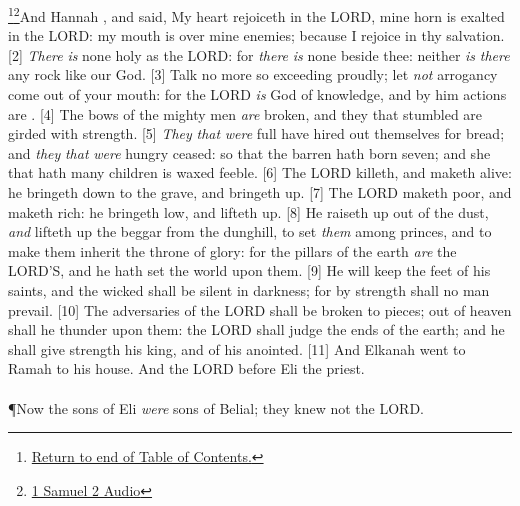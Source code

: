\footnote{\textcolor[cmyk]{0.99998,1,0,0}{\hyperlink{TOC}{Return to end of Table of Contents.}}}\footnote{\href{https://audiobible.com/bible/1_samuel_2.html}{\textcolor[cmyk]{0.99998,1,0,0}{1 Samuel 2 Audio}}}\textcolor[cmyk]{0.99998,1,0,0}{And Hannah , and said, My heart rejoiceth in the LORD, mine horn is exalted in the LORD: my mouth is  over mine enemies; because I rejoice in thy salvation.}
[2] \textcolor[cmyk]{0.99998,1,0,0}{\emph{There} \emph{is} none holy as the LORD: for \emph{there} \emph{is} none beside thee: neither \emph{is} \emph{there} any rock like our God.}
[3] \textcolor[cmyk]{0.99998,1,0,0}{Talk no more so exceeding proudly; let \emph{not} arrogancy come out of your mouth: for the LORD \emph{is}  God of knowledge, and by him actions are .}
[4] \textcolor[cmyk]{0.99998,1,0,0}{The bows of the mighty men \emph{are} broken, and they that stumbled are girded with strength.}
[5] \textcolor[cmyk]{0.99998,1,0,0}{\emph{They} \emph{that} \emph{were} full have hired out themselves for bread; and \emph{they} \emph{that} \emph{were} hungry ceased: so that the barren hath born seven; and she that hath many children is waxed feeble.}
[6] \textcolor[cmyk]{0.99998,1,0,0}{The LORD killeth, and maketh alive: he bringeth down to the grave, and bringeth up.}
[7] \textcolor[cmyk]{0.99998,1,0,0}{The LORD maketh poor, and maketh rich: he bringeth low, and lifteth up.}
[8] \textcolor[cmyk]{0.99998,1,0,0}{He raiseth up  out of the dust, \emph{and} lifteth up the beggar from the dunghill, to set \emph{them} among princes, and to make them inherit the throne of glory: for the pillars of the earth \emph{are} the LORD'S, and he hath set the world upon them.}
[9] \textcolor[cmyk]{0.99998,1,0,0}{He will keep the feet of his saints, and the wicked shall be silent in darkness; for by strength shall no man prevail.}
[10] \textcolor[cmyk]{0.99998,1,0,0}{The adversaries of the LORD shall be broken to pieces; out of heaven shall he thunder upon them: the LORD shall judge the ends of the earth; and he shall give strength  his king, and  of his anointed.}
[11] \textcolor[cmyk]{0.99998,1,0,0}{And Elkanah went to Ramah to his house. And   the LORD before Eli the priest.}\\
\\
\P \textcolor[cmyk]{0.99998,1,0,0}{Now the sons of Eli \emph{were} sons of Belial; they knew not the LORD.}
